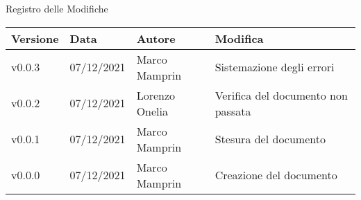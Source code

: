 \begin{center}
    \huge{Registro delle Modifiche}
  \end{center}
  
  \begin{center}
    \begin{tabular}{|p{2cm}|p{2cm}|p{3cm}|p{5cm}|}
      \hline
      \textbf{Versione} & \textbf{Data} & \textbf{Autore} & \textbf{Modifica}                    \\ \hline
      v0.0.3            & 07/12/2021    & Marco Mamprin   & Sistemazione degli errori \\ \hline
      v0.0.2            & 07/12/2021    & Lorenzo Onelia  & Verifica del documento non passata \\ \hline
      v0.0.1            & 07/12/2021    & Marco Mamprin   & Stesura del documento \\ \hline
      v0.0.0            & 07/12/2021    & Marco Mamprin   & Creazione del documento \\ \hline
    \end{tabular}
  \end{center}